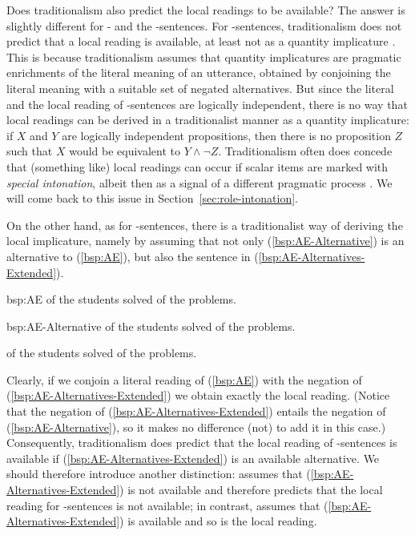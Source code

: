 \documentclass[fleqn,reqno,10pt,draft]{article}
\newcommand{\as}{\acro{as}}
\renewcommand{\es}{\acro{es}}
\begin{document}
Does traditionalism also predict the local readings to be available?
The answer is slightly different for \as- and the \es-sentences. For
\es-sentences, traditionalism does not predict that a local reading is
available, at least not as a quantity implicature
\citep[c.f.][]{GeurtsPouscoulous2009:Embedded-Implic,ChemlaSpector2010:Experimental-Ev}. This
is because traditionalism assumes that quantity implicatures are
pragmatic enrichments of the literal meaning of an utterance, obtained
by conjoining the literal meaning with a suitable set of negated
alternatives. But since the literal and the local reading of
\es-sentences are logically independent, there is no way that local
readings can be derived in a traditionalist manner as a quantity
implicature: if $X$ and $Y$ are logically independent propositions,
then there is no proposition $Z$ such that $X$ would be equivalent to
$Y \wedge \neg Z$. Traditionalism often does concede that (something
like) local readings can occur if scalar items are marked with
\emph{special intonation}, albeit then as a signal of a different
pragmatic process
\citep[e.g.][]{Horn2006:The-Border-Wars,Geurts2009:Scalar-Implicat,Geurts2010:Quantity-Implic}. We
will come back to this issue in Section~\ref{sec:role-intonation}.

On the other hand, as for \as-sentences, there is a traditionalist way
of deriving the local implicature, namely by assuming that not only
(\ref{bsp:AE-Alternative}) is an alternative to (\ref{bsp:AE}), but
also the sentence in (\ref{bsp:AE-Alternatives-Extended}).

\begin{exer}{bsp:AE}
  \ex {} of the students solved  of the problems.
\end{exer}

\begin{exer}{bsp:AE-Alternative}
  \ex {} of the students solved  of the problems.
\end{exer}

\begin{exe}
\ex \label{bsp:AE-Alternatives-Extended}  of the students solved  of the problems.
\end{exe}

\noindent Clearly, if we conjoin a literal reading of (\ref{bsp:AE})
with the negation of (\ref{bsp:AE-Alternatives-Extended}) we obtain
exactly the local reading. (Notice that the negation of
(\ref{bsp:AE-Alternatives-Extended}) entails the negation of
(\ref{bsp:AE-Alternative}), so it makes no difference (not) to add it
in this case.) Consequently, traditionalism does predict that the
local reading of \as-sentences is available if
(\ref{bsp:AE-Alternatives-Extended}) is an available alternative. We
should therefore introduce another distinction:  assumes that (\ref{bsp:AE-Alternatives-Extended}) is
not available and therefore predicts that the local reading for
\as-sentences is not available; in contrast,  assumes that (\ref{bsp:AE-Alternatives-Extended}) is
available and so is the local reading.
\end{document}
